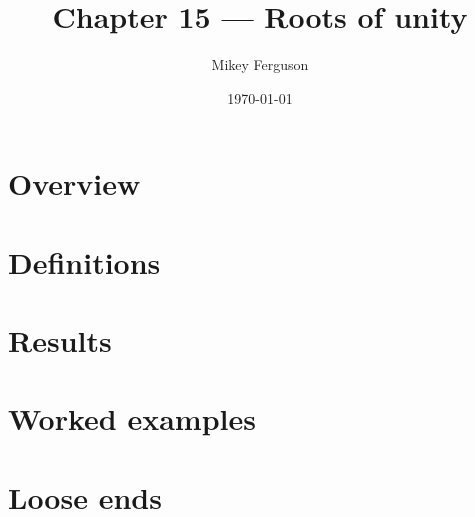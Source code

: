 \documentclass[11pt]{article}
\title{Chapter 15 --- Roots of unity}
\author{Mikey Ferguson}
\date{\today}
\begin{document}
\maketitle
\tableofcontents
\bigskip

\section{Overview}

\section{Definitions}

\section{Results}

\section{Worked examples}

\section{Loose ends}
\end{document}
